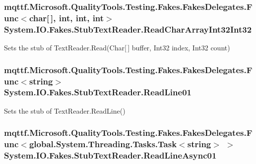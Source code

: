 \hypertarget{class_system_1_1_i_o_1_1_fakes_1_1_stub_text_reader_ab7543a2bea16076d9648322fe96e4838}{
\subsubsection[{Read\-Char\-Array\-Int32\-Int32}]{\setlength{\rightskip}{0pt plus 5cm}mqttf.\-Microsoft.\-Quality\-Tools.\-Testing.\-Fakes.\-Fakes\-Delegates.\-Func$<$char\mbox{[}$\,$\mbox{]}, int, int, int$>$ System.\-I\-O.\-Fakes.\-Stub\-Text\-Reader.\-Read\-Char\-Array\-Int32\-Int32}}\label{class_system_1_1_i_o_1_1_fakes_1_1_stub_text_reader_ab7543a2bea16076d9648322fe96e4838}


Sets the stub of Text\-Reader.\-Read(\-Char\mbox{[}$\,$\mbox{]} buffer, Int32 index, Int32 count)

\hypertarget{class_system_1_1_i_o_1_1_fakes_1_1_stub_text_reader_aef676e62f83011951851972823f0e453}{
\subsubsection[{Read\-Line01}]{\setlength{\rightskip}{0pt plus 5cm}mqttf.\-Microsoft.\-Quality\-Tools.\-Testing.\-Fakes.\-Fakes\-Delegates.\-Func$<$string$>$ System.\-I\-O.\-Fakes.\-Stub\-Text\-Reader.\-Read\-Line01}}\label{class_system_1_1_i_o_1_1_fakes_1_1_stub_text_reader_aef676e62f83011951851972823f0e453}


Sets the stub of Text\-Reader.\-Read\-Line()

\hypertarget{class_system_1_1_i_o_1_1_fakes_1_1_stub_text_reader_afff2ee6b6d83042e7b0fcac4f85ee8ae}{
\subsubsection[{Read\-Line\-Async01}]{\setlength{\rightskip}{0pt plus 5cm}mqttf.\-Microsoft.\-Quality\-Tools.\-Testing.\-Fakes.\-Fakes\-Delegates.\-Func$<$global.\-System.\-Threading.\-Tasks.\-Task$<$string$>$ $>$ System.\-I\-O.\-Fakes.\-Stub\-Text\-Reader.\-Read\-Line\-Async01}}\label{class_system_1_1_i_o_1_1_fakes_1_1_stub_text_reader_afff2ee6b6d83042e7b0fcac4f85ee8ae}


